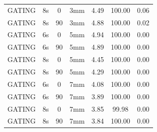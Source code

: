 \documentclass[type=dr, dr=rernat, accentcolor=tud7b,colorbacktitle, bigchapter, openright, twoside, 12pt ]{tudthesis}
\begin{document}
\begin{table}[H]
\begin{tabular}{|c||c|c|c||c|c|c|}
GATING & 8s & 0 & 3mm & 4.49 & 100.00 & 0.06 \\
GATING & 8s & 90 & 3mm & 4.88 & 100.00 & 0.02 \\
GATING & 6s & 0 & 5mm & 4.94 & 100.00 & 0.00 \\
GATING & 6s & 90 & 5mm & 4.89 & 100.00 & 0.00 \\
GATING & 8s & 0 & 5mm & 4.45 & 100.00 & 0.00 \\
GATING & 8s & 90 & 5mm & 4.29 & 100.00 & 0.00 \\
GATING & 6s & 0 & 7mm & 4.08 & 100.00 & 0.00 \\
GATING & 6s & 90 & 7mm & 3.89 & 100.00 & 0.00 \\
GATING & 8s & 0 & 7mm & 3.85 & 99.98 & 0.00 \\
GATING & 8s & 90 & 7mm & 3.84 & 100.00 & 0.00 \\
    \hline\hline 
  \end{tabular}
\end{table}


\newpage
\end{document}
